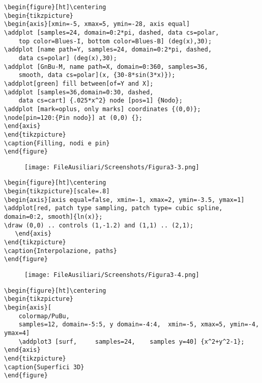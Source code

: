 \begin{verbatim}
\begin{figure}[ht]\centering
\begin{tikzpicture}
\begin{axis}[xmin=-5, xmax=5, ymin=-28, axis equal]
\addplot [samples=24, domain=0:2*pi, dashed, data cs=polar,
	top color=Blues-I, bottom color=Blues-B] (deg(x),30);
\addplot [name path=Y, samples=24, domain=0:2*pi, dashed,
    data cs=polar] (deg(x),30);
\addplot [GnBu-M, name path=X, domain=0:360, samples=36,
    smooth, data cs=polar](x, {30-8*sin(3*x)});
\addplot[green] fill between[of=Y and X];
\addplot [samples=36,domain=0:30, dashed,
    data cs=cart] {.025*x^2} node [pos=1] {Nodo};
\addplot [mark=oplus, only marks] coordinates {(0,0)};
\node[pin=120:{Pin nodo}] at (0,0) {};
\end{axis}
\end{tikzpicture}
\caption{Filling, nodi e pin}
\end{figure}	
\end{verbatim}

\begin{figure}[ht]\centering
\texttt{[image: FileAusiliari/Screenshots/Figura3-3.png]}
\end{figure}

\newpage
\begin{verbatim}
\begin{figure}[ht]\centering
\begin{tikzpicture}[scale=.8]
\begin{axis}[axis equal=false, xmin=-1, xmax=2, ymin=-3.5, ymax=1]
\addplot[red, patch type sampling, patch type= cubic spline, domain=0:2, smooth]{ln(x)};
\draw (0,0) .. controls (1,-1.2) and (1,1) .. (2,1);
   \end{axis}
\end{tikzpicture}
\caption{Interpolazione, paths}
\end{figure}
\end{verbatim}

\begin{figure}[ht]\centering
\texttt{[image: FileAusiliari/Screenshots/Figura3-4.png]}
\end{figure}

\newpage

\begin{verbatim}
\begin{figure}[ht]\centering
\begin{tikzpicture}
\begin{axis}[
    colormap/PuBu,
    samples=12, domain=-5:5, y domain=-4:4,  xmin=-5, xmax=5, ymin=-4, ymax=4]
    \addplot3 [surf,     samples=24,    samples y=40] {x^2+y^2-1};
\end{axis}
\end{tikzpicture}	
\caption{Superfici 3D}
\end{figure}
\end{verbatim}

